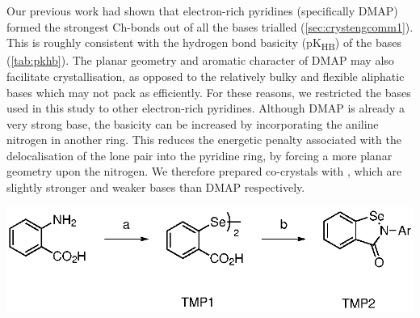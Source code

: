 \begin{refsection}

  
Our previous work had shown that electron-rich pyridines (specifically DMAP) formed the strongest Ch-bonds out of all the bases trialled (\cref{sec:crystengcomm1}).
This is roughly consistent with the hydrogen bond basicity (pK\textsubscript{HB}) of the bases (\cref{tab:pkhb}).
The planar geometry and aromatic character of DMAP may also facilitate crystallisation, as opposed to the relatively bulky and flexible aliphatic bases which may not pack as efficiently.
For these reasons, we restricted the bases used in this study to other electron-rich pyridines.
Although DMAP is already a very strong base, the basicity can be increased by incorporating the aniline nitrogen in another ring.
This reduces the energetic penalty associated with the delocalisation of the lone pair into the pyridine ring, by forcing a more planar geometry upon the nitrogen.\autocite{Berthelot1998,Heinrich2003EnhancingFixation}
We therefore prepared co-crystals with , which are slightly stronger and weaker bases than DMAP respectively.

\begin{scheme}
  \centering
  \includegraphics[scale=0.74]{Figures/ebs-synthesis.eps}
  

\end{scheme}
\end{refsection}
